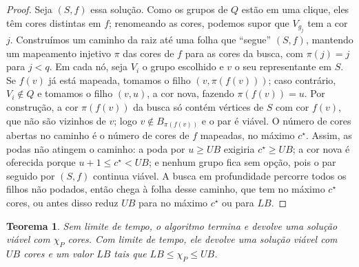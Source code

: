 \documentclass[12pt]{article}
\newtheorem{teorema}{Teorema}
\newcommand{\chiP}{\chi_P}
\newcommand{\LB}{\mathit{LB}}
\newcommand{\UB}{\mathit{UB}}
\begin{document}
\begin{proof}
  Seja $(S,f)$ essa solução. Como os grupos de $Q$ estão em uma clique, eles
  têm cores distintas em $f$; renomeando as cores, podemos supor que
  $V_{g_j}$ tem a cor $j$. Construímos um caminho da raiz até uma folha que
  ``segue'' $(S,f)$, mantendo um mapeamento injetivo $\pi$ das cores de $f$
  para as cores da busca, com $\pi(j)=j$ para $j<q$. Em cada nó, seja $V_i$ o
  grupo escolhido e $v$ o seu representante em $S$. Se $f(v)$ já está
  mapeada, tomamos o filho $(v,\pi(f(v)))$; caso contrário, $V_i\notin Q$ e
  tomamos o filho $(v,u)$, a cor nova, fazendo $\pi(f(v))=u$. Por
  construção, a cor $\pi(f(v))$ da busca só contém vértices de $S$ com cor
  $f(v)$, que não são vizinhos de $v$; logo $v\notin B_{\pi(f(v))}$ e o par é
  viável. O número de cores abertas no caminho é o número de cores de $f$
  mapeadas, no máximo $c^\star$. Assim, as podas não atingem o caminho: a poda
  por $u\ge\UB$ exigiria $c^\star\ge\UB$; a cor nova é oferecida porque
  $u+1\le c^\star<\UB$; e nenhum grupo fica sem opção, pois o par seguido por
  $(S,f)$ continua viável. A busca em profundidade percorre todos os filhos
  não podados, então chega à folha desse caminho, que tem no máximo $c^\star$
  cores, ou antes disso reduz $\UB$ para no máximo $c^\star$ ou para $\LB$.
\end{proof}

\begin{teorema}\label{teo:correcao}
  Sem limite de tempo, o algoritmo termina e devolve uma solução viável com
  $\chiP$ cores. Com limite de tempo, ele devolve uma solução viável com $\UB$
  cores e um valor $\LB$ tais que $\LB\le\chiP\le\UB$.
\end{teorema}
\end{document}
